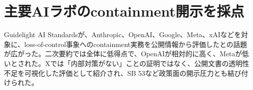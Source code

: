 \section{主要AIラボのcontainment開示を採点}
Guidelight AI Standardsが、Anthropic、OpenAI、Google、Meta、xAIなどを対象に、loss-of-control事象へのcontainment実務を公開情報から評価したとの話題が広がった。二次要約では全体に低得点で、OpenAIが相対的に高く、Metaが低いとされた。Xでは「内部対策がない」ことの証明ではなく、公開文書の透明性不足を可視化した評価として紹介され、SB 53など政策面の開示圧力とも結び付けられた。
